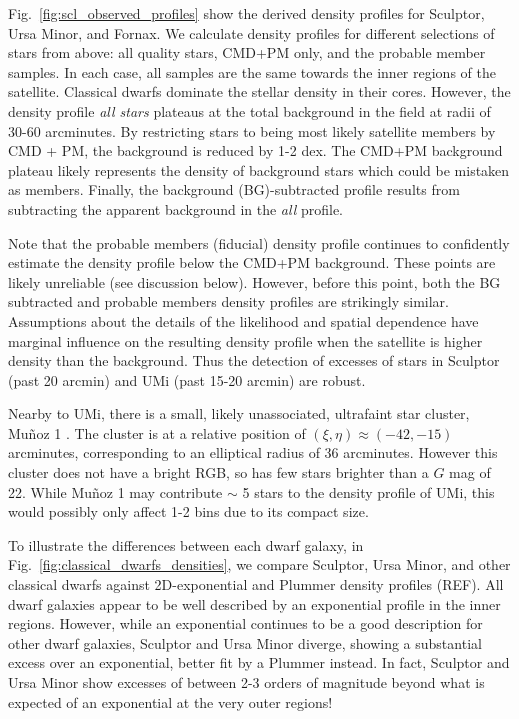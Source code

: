 Fig.~\ref{fig:scl_observed_profiles} show the derived density profiles
for Sculptor, Ursa Minor, and Fornax. We calculate density profiles for
different selections of stars from above: all quality stars, CMD+PM
only, and the probable member samples. In each case, all samples are the
same towards the inner regions of the satellite. Classical dwarfs
dominate the stellar density in their cores. However, the density
profile \emph{all stars} plateaus at the total background in the field
at radii of 30-60 arcminutes. By restricting stars to being most likely
satellite members by CMD + PM, the background is reduced by 1-2 dex. The
CMD+PM background plateau likely represents the density of background
stars which could be mistaken as members. Finally, the background
(BG)-subtracted profile results from subtracting the apparent background
in the \emph{all} profile.

Note that the probable members (fiducial) density profile continues to
confidently estimate the density profile below the CMD+PM background.
These points are likely unreliable (see discussion below). However,
before this point, both the BG subtracted and probable members density
profiles are strikingly similar. Assumptions about the details of the
likelihood and spatial dependence have marginal influence on the
resulting density profile when the satellite is higher density than the
background. Thus the detection of excesses of stars in Sculptor (past 20
arcmin) and UMi (past 15-20 arcmin) are robust.

Nearby to UMi, there is a small, likely unassociated, ultrafaint star
cluster, Muñoz 1 \citep{munoz+2012}. The cluster is at a relative
position of \((\xi, \eta) \approx(-42, -15)\) arcminutes, corresponding
to an elliptical radius of 36 arcminutes. However this cluster does not
have a bright RGB, so has few stars brighter than a \(G\) mag of 22.
While Muñoz 1 may contribute \(\sim\) 5 stars to the density profile of
UMi, this would possibly only affect 1-2 bins due to its compact size.

To illustrate the differences between each dwarf galaxy, in
Fig.~\ref{fig:classical_dwarfs_densities}, we compare Sculptor, Ursa
Minor, and other classical dwarfs against 2D-exponential and Plummer
density profiles (REF). All dwarf galaxies appear to be well described
by an exponential profile in the inner regions. However, while an
exponential continues to be a good description for other dwarf galaxies,
Sculptor and Ursa Minor diverge, showing a substantial excess over an
exponential, better fit by a Plummer instead. In fact, Sculptor and Ursa
Minor show excesses of between 2-3 orders of magnitude beyond what is
expected of an exponential at the very outer regions!

